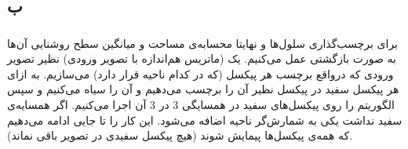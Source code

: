 \documentclass{article}
\begin{document}
\subsubsection{}
\begin{latin}

\end{latin}

\subsubsection{}
\begin{latin}

\end{latin}


\subsection{ب}

\subsubsection{}
برای برچسب‌گذاری سلول‌ها و نهایتا محسابه‌ی مساحت و میانگین سطح روشنایی آن‌ها به صورت بازگشتی عمل می‌کنیم. یک  (ماتریس هم‌اندازه با تصویر ورودی) نظیر تصویر ورودی که درواقع برچسب هر پیکسل (که در کدام ناحیه قرار دارد) می‌سازیم. به ازای هر پیکسل سفید در  پیکسل نظیر آن را برچسب می‌دهیم و آن را سیاه می‌کنیم و سپس الگوریتم را روی پیکسل‌های سفید در همسایگی 3 در 3 آن اجرا می‌کنیم. اگر همسایه‌ی سفید نداشت یکی به شمارش‌گر ناحیه اضافه می‌شود. این کار را تا جایی ادامه می‌دهیم که همه‌ی پیکسل‌ها پیمایش شوند (هیچ پیکسل سفیدی در تصویر باقی نماند).

\subsubsection{}
\begin{latin}

\end{latin}

\subsubsection{}
\begin{latin}

\end{latin}



\section{}%
\end{document}
